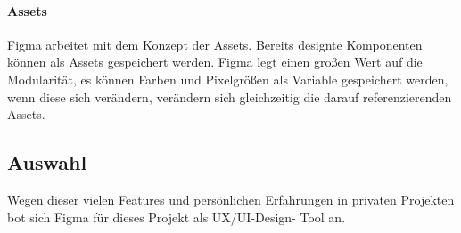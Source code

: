 \paragraph{Assets}
Figma arbeitet mit dem Konzept der Assets. Bereits designte Komponenten können als Assets gespeichert werden. Figma legt einen großen Wert auf die Modularität, es können Farben und Pixelgrößen als Variable gespeichert werden, wenn diese sich verändern, verändern sich gleichzeitig die darauf referenzierenden Assets.

\subsection{Auswahl}
Wegen dieser vielen Features und persönlichen Erfahrungen in privaten Projekten bot sich Figma für dieses Projekt als UX/UI-Design- Tool an.